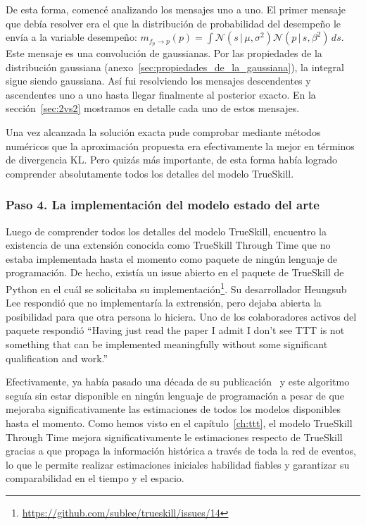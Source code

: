\documentclass[a4paper,11pt]{book}
\newcommand{\N}{\mathcal{N}}
\theoremstyle{definition}
\begin{document}

De esta forma, comenc\'e analizando los mensajes uno a uno.
%
El primer mensaje que deb\'ia resolver era el que la distribuci\'on de probabilidad del desempe\~no le env\'ia a la variable desempe\~no:
$m_{f_p\rightarrow p}(p) = \int \N(s\,|\,\mu, \sigma^2) \N(p\,|\,s,\beta^2) \, ds$.
%
Este mensaje es una convoluci\'on de gaussianas.
%
Por las propiedades de la distribuci\'on gaussiana (anexo~\ref{sec:propiedades_de_la_gaussiana}), la integral sigue siendo gaussiana.
%
As\'i fui resolviendo los mensajes descendentes y ascendentes uno a uno hasta llegar finalmente al posterior exacto.
%
En la secci\'on~\ref{sec:2vs2} mostramos en detalle cada uno de estos mensajes.


Una vez alcanzada la soluci\'on exacta pude comprobar mediante m\'etodos num\'ericos que la aproximaci\'on propuesta era efectivamente la mejor en t\'erminos de divergencia KL.
%
Pero quiz\'as m\'as importante, de esta forma hab\'ia logrado comprender absolutamente todos los detalles del modelo TrueSkill.

\subsubsection{Paso 4. La implementaci\'on del modelo estado del arte}

Luego de comprender todos los detalles del modelo TrueSkill, encuentro la existencia de una extensi\'on conocida como TrueSkill Through Time que no estaba implementada hasta el momento como paquete de ning\'un lenguaje de programaci\'on.
%
De hecho, exist\'ia un issue abierto en el paquete de TrueSkill de Python en el cu\'al se solicitaba su implementaci\'on\footnote{\url{https://github.com/sublee/trueskill/issues/14}}.
%
Su desarrollador Heungsub Lee respondi\'o que no implementar\'ia la extrensi\'on, pero dejaba abierta la posibilidad para que otra persona lo hiciera.
%
Uno de los colaboradores activos del paquete respondi\'o ``Having just read the paper I admit I don't see TTT is not something that can be implemented meaningfully without some significant qualification and work.''


Efectivamente, ya hab\'ia pasado una d\'ecada de su publicaci\'on~\cite{Dangauthier2007} y este algoritmo segu\'ia sin estar disponible en ning\'un lenguaje de programaci\'on a pesar de que mejoraba significativamente las estimaciones de todos los modelos disponibles hasta el momento.
%
Como hemos visto en el cap\'itulo~\ref{ch:ttt}, el modelo TrueSkill Through Time mejora significativamente le estimaciones respecto de TrueSkill gracias a que propaga la informaci\'on hist\'orica a trav\'es de toda la red de eventos, lo que le permite realizar estimaciones iniciales habilidad fiables y garantizar su comparabilidad en el tiempo y el espacio.
\end{document}
